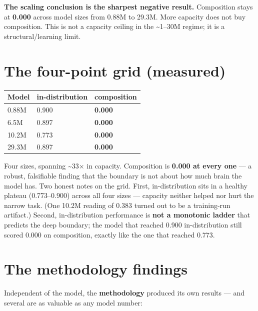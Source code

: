 \textbf{The scaling conclusion is the sharpest negative result.}
Composition stays at \textbf{0.000} across model sizes from 0.88M to
29.3M. More capacity does not buy composition. This is not a capacity
ceiling in the \textasciitilde1--30M regime; it is a structural/learning
limit.

\section{The four-point grid
(measured)}\label{the-four-point-grid-measured}

\begin{longtable}[]{@{}lll@{}}
\toprule\noalign{}
Model & in-distribution & composition \\
\midrule\noalign{}
\endhead
\bottomrule\noalign{}
\endlastfoot
0.88M & 0.900 & \textbf{0.000} \\
6.5M & 0.897 & \textbf{0.000} \\
10.2M & 0.773 & \textbf{0.000} \\
29.3M & 0.897 & \textbf{0.000} \\
\end{longtable}

Four sizes, spanning \textasciitilde33× in capacity. Composition is
\textbf{0.000 at every one} --- a robust, falsifiable finding that the
boundary is not about how much brain the model has. Two honest notes on
the grid. First, in-distribution sits in a healthy plateau
(0.773--0.900) across all four sizes --- capacity neither helped nor
hurt the narrow task. (One 10.2M reading of 0.383 turned out to be a
training-run artifact.) Second, in-distribution performance is
\textbf{not a monotonic ladder} that predicts the deep boundary; the
model that reached 0.900 in-distribution still scored 0.000 on
composition, exactly like the one that reached 0.773.

\section{The methodology findings}\label{the-methodology-findings}

Independent of the model, the \textbf{methodology} produced its own
results --- and several are as valuable as any model number:

